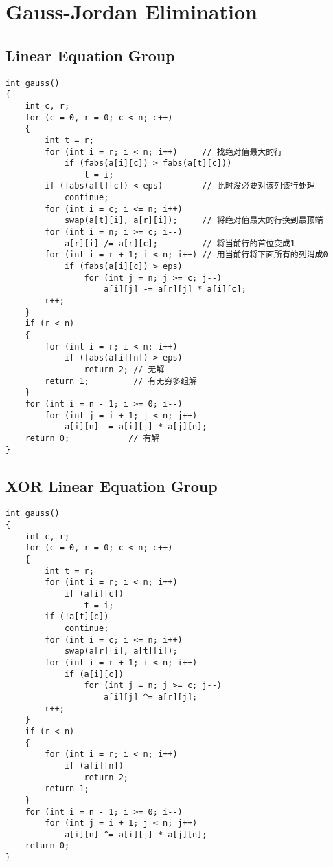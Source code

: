 \section{Gauss-Jordan Elimination}
\subsection{Linear Equation Group}
\begin{lstlisting}
int gauss()
{
    int c, r;
    for (c = 0, r = 0; c < n; c++)
    {
        int t = r;
        for (int i = r; i < n; i++)     // 找绝对值最大的行
            if (fabs(a[i][c]) > fabs(a[t][c]))
                t = i;
        if (fabs(a[t][c]) < eps)        // 此时没必要对该列该行处理
            continue;
        for (int i = c; i <= n; i++)
            swap(a[t][i], a[r][i]);     // 将绝对值最大的行换到最顶端
        for (int i = n; i >= c; i--)
            a[r][i] /= a[r][c];         // 将当前行的首位变成1
        for (int i = r + 1; i < n; i++) // 用当前行将下面所有的列消成0
            if (fabs(a[i][c]) > eps)
                for (int j = n; j >= c; j--)
                    a[i][j] -= a[r][j] * a[i][c];
        r++;
    }
    if (r < n)
    {
        for (int i = r; i < n; i++)
            if (fabs(a[i][n]) > eps)
                return 2; // 无解
        return 1;         // 有无穷多组解
    }
    for (int i = n - 1; i >= 0; i--)
        for (int j = i + 1; j < n; j++)
            a[i][n] -= a[i][j] * a[j][n];
    return 0;            // 有解
}
\end{lstlisting}
\subsection{XOR Linear Equation Group}
\begin{lstlisting}
int gauss()
{
    int c, r;
    for (c = 0, r = 0; c < n; c++)
    {
        int t = r;
        for (int i = r; i < n; i++)
            if (a[i][c])
                t = i;
        if (!a[t][c])
            continue;
        for (int i = c; i <= n; i++)
            swap(a[r][i], a[t][i]);
        for (int i = r + 1; i < n; i++)
            if (a[i][c])
                for (int j = n; j >= c; j--)
                    a[i][j] ^= a[r][j];
        r++;
    }
    if (r < n)
    {
        for (int i = r; i < n; i++)
            if (a[i][n])
                return 2;
        return 1;
    }
    for (int i = n - 1; i >= 0; i--)
        for (int j = i + 1; j < n; j++)
            a[i][n] ^= a[i][j] * a[j][n];
    return 0;
}
\end{lstlisting}
